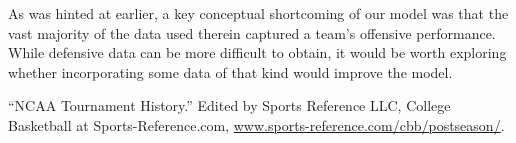 \documentclass[10pt,a4paper, hidelinks]{article} %
\begin{document}
As was hinted at earlier, a key conceptual shortcoming of our model was that the vast majority of the data used therein captured a team's offensive performance. While defensive data can be more difficult to obtain, it would be worth exploring whether incorporating some data of that kind would improve the model. 



\newpage
\begin{thebibliography}{9}
	
	“NCAA Tournament History.” Edited by Sports Reference LLC, College Basketball at Sports-Reference.com, {\color{blue} \url{www.sports-reference.com/cbb/postseason/}}.
	
\end{thebibliography}
\end{document}
